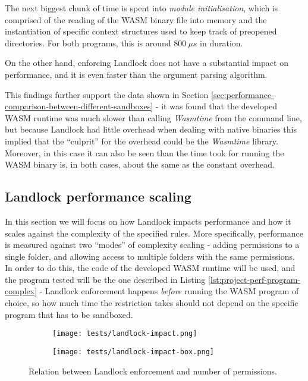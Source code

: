 The next biggest chunk of time is spent into \textit{module initialisation}, which is comprised of the
reading of the WASM binary file into memory and the instantiation of specific context structures used
to keep track of preopened directories. For both programs, this is around $800\ \mu s$ in duration.

On the other hand, enforcing Landlock does not have a substantial impact on performance,
and it is even faster than the argument parsing algorithm.

This findings further support the data shown in Section \ref{sec:performance-comparison-between-different-sandboxes} -
it was found that the developed WASM runtime was much slower than calling \textit{Wasmtime} from the command
line, but because Landlock had little overhead when dealing with native binaries this implied that
the ``culprit'' for the overhead could be the \textit{Wasmtime} library.
Moreover, in this case it can also be seen than the time took for running the WASM binary is, in both cases, about
the same as the constant overhead.

\clearpage
\subsection{Landlock performance scaling}
\label{sec:performance-internal-analysis-landlock-impact}

In this section we will focus on how Landlock impacts performance and how it scales
against the complexity of the specified rules. More specifically, performance is measured against
two ``modes'' of complexity scaling - adding permissions to a single folder, and allowing access to multiple folders
with the same permissions.
In order to do this, the code of the developed WASM runtime will be used, and
the program tested will be the one described in Listing \ref{lst:project-perf-program-complex} - Landlock enforcement
happens \textit{before} running the WASM program of choice, so how much time the restriction takes should not
depend on the specific program that has to be sandboxed.

\begin{figure}[hbt!]
  \centering
  \begin{subfigure}[b]{0.49\textwidth}
    \texttt{[image: tests/landlock-impact.png]}
  \end{subfigure}
  \begin{subfigure}[b]{0.49\textwidth}
    \texttt{[image: tests/landlock-impact-box.png]}
  \end{subfigure}

  \caption{Relation between Landlock enforcement and number of permissions.}
  \label{fig:perf-test-landlock-impact-permissions}
\end{figure}

